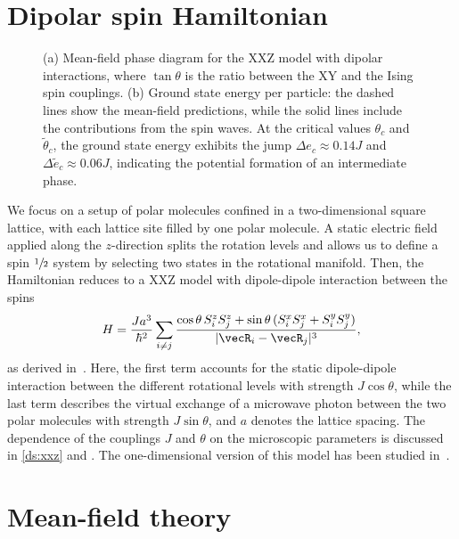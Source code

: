 \section{Dipolar spin Hamiltonian}
\begin{figure}[t]
    \centering
    \caption{(a) Mean-field phase diagram for the XXZ model with dipolar interactions, where $\tan \theta$ is the ratio between the XY and the Ising spin couplings. (b) Ground state energy per particle: the dashed lines show the mean-field predictions, while the solid lines include the contributions from the spin waves. At the critical values $\theta_{c}$ and $\tilde{\theta}_{c}$, the ground state energy exhibits the jump $\Delta e_{c}\approx 0.14J$ and $\Delta \tilde{e}_{c}\approx 0.06J$, indicating the potential formation of an intermediate phase.}
\end{figure}

We focus on a setup of polar molecules confined in a two-dimensional square lattice,
with each lattice site filled by one polar molecule. A static electric field applied along
the $z$-direction splits the rotation levels and allows us to define a spin $\sfrac{1}{2}$ system by selecting
two states in the rotational manifold.
Then, the Hamiltonian reduces to a XXZ model with dipole-dipole interaction between the spins \cite{Gorshkov2011,Muller2009}
\begin{align}
H = \frac{J a^3}{\hbar^2} \sum_{i \neq j} \frac{\cos \theta \,
S^{z}_{i}S^{z}_{j}+ \sin \theta
\, ( S^{x}_{i} S^{x}_{j} + S^{y}_{i} S^{y}_{j} ) }{|\vecR_{i} - \vecR_{j}|^3},
\end{align}
%
as derived in~. Here, the first term accounts for the static dipole-dipole
interaction between the different rotational levels with strength $J \cos \theta$, while the last term
describes the virtual exchange of a microwave photon between the two polar molecules with
strength $J \sin \theta$, and $a$ denotes the lattice spacing.
The dependence of the couplings $J$ and $\theta$ on the microscopic
parameters is discussed in \cref{ds:xxz} and . The one-dimensional version of this model has been studied in~\cite{Hauke2010}.

\section{Mean-field theory}

